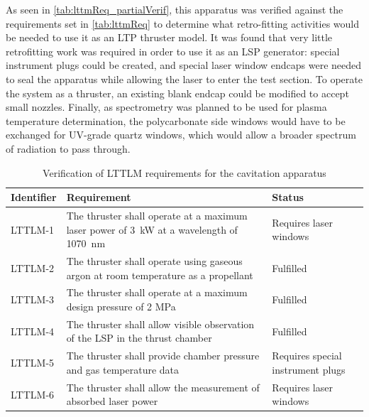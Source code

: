             As seen in \autoref{tab:lttmReq_partialVerif}, this apparatus was verified against the requirements set in \autoref{tab:lttmReq} to determine what retro-fitting activities would be needed to use it as an LTP thruster model. It was found that very little retrofitting work was required in order to use it as an LSP generator: special instrument plugs could be created, and special laser window endcaps were needed to seal the apparatus while allowing the laser to enter the test section. To operate the system as a thruster, an existing blank endcap could be modified to accept small nozzles. Finally, as spectrometry was planned to be used for plasma temperature determination, the polycarbonate side windows would have to be exchanged for UV-grade quartz windows, which would allow a broader spectrum of radiation to pass through.
        
            \begin{table}[h]
                \renewcommand{\arraystretch}{1.3}
                \centering
                \caption{Verification of LTTLM requirements for the cavitation apparatus}
                \label{tab:lttmReq_partialVerif}
                \begin{tabular}{l>{\raggedright}p{}p{}<{\raggedright}}
                    \toprule
                    Identifier & Requirement                                                                   & Status                   \\ \midrule
                    LTTLM-1             & The thruster shall operate at a maximum laser power of \qty{3}{kW} at a wavelength of \qty{1070}{nm} & Requires laser windows            \\
                    LTTLM-2             & The thruster shall operate using gaseous argon at room temperature as a propellant     & Fulfilled                         \\
                    LTTLM-3             & The thruster shall operate at a maximum design pressure of 2 MPa                       & Fulfilled                         \\
                    LTTLM-4             & The thruster shall allow visible observation of the LSP in the thrust chamber          & Fulfilled                         \\
                    LTTLM-5             & The thruster shall provide chamber pressure and gas temperature data                   & Requires special instrument plugs \\
                    LTTLM-6             & The thruster shall allow the measurement of absorbed laser power                       & Requires laser windows            \\ \bottomrule
                \end{tabular}
            \end{table}
            
